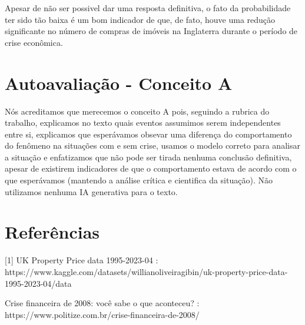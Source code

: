 \documentclass{article}
\begin{document}
    Apesar de não ser possivel dar uma resposta definitiva, o fato da probabilidade ter sido tão baixa é um bom indicador de que,
    de fato, houve uma redução significante no número de compras de imóveis na Inglaterra durante o período de crise econômica.\\


    \section*{Autoavaliação - Conceito A}

    Nós acreditamos que merecemos o conceito A pois, seguindo a rubrica do trabalho, explicamos no texto
    quais eventos assumimos serem independentes entre si, explicamos que esperávamos obsevar uma diferença
    do comportamento do fenômeno na situações com e sem crise, usamos o modelo correto para analisar a 
    situação e enfatizamos que não pode ser tirada nenhuma conclusão definitiva, apesar de existirem
    indicadores de que o comportamento estava de acordo com o que esperávamos (mantendo a análise crítica
    e cientifica da situação). Não utilizamos nenhuma IA generativa para o texto.\\


    \section*{Referências}

    [1] UK Property Price data 1995-2023-04 : https://www.kaggle.com/datasets/willianoliveiragibin/uk-property-price-data-1995-2023-04/data

    \noindent[2] Crise financeira de 2008: você sabe o que aconteceu? : https://www.politize.com.br/crise-financeira-de-2008/
\end{document}
